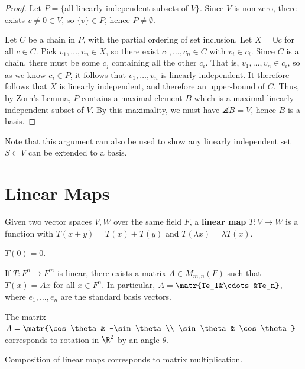 \begin{proof}
    Let $P = \{$all linearly independent subsets of $V\}$. Since $V$ is non-zero, there exists $v \neq 0 \in V$, so $\{v\} \in P$, hence $P \ne \emptyset$.

    Let $C$ be a chain in $P$, with the partial ordering of set inclusion. Let $X = \cup c$ for all $c \in C$. Pick $v_1,\dots,v_n \in X$, so there exist $c_1,\dots,c_n \in C$ with $v_i \in c_i$. Since $C$ is a chain, there must be some $c_j$ containing all the other $c_i$. That is, $v_1,\dots,v_n \in c_i$, so as we know $c_i \in P$, it follows that $v_1,\dots,v_n$ is linearly independent. It therefore follows that $X$ is linearly independent, and therefore an upper-bound of $C$. Thus, by Zorn's Lemma, $P$ contains a maximal element $B$ which is a maximal linearly independent subset of $V$. By this maximality, we must have $\angles B =V$, hence $B$ is a basis.
\end{proof}
Note that this argument can also be used to show any linearly independent set $S \subset V$ can be extended to a basis.

\section{Linear Maps}

\begin{defn}
    Given two vector spaces $V,W$ over the same field $F$, a \textbf{linear map} $T:V \to W$ is a function with $T(x+y) = T(x) + T(y)$ and $T(\lambda x)=\lambda T(x)$.
\end{defn}

\begin{prop}
    $T(0)=0$.
\end{prop}

\begin{thm}
    If $T:F^n \to F^m$ is linear, there exists a matrix $A \in M_{m,n}(F)$ such that $T(x)=Ax$ for all $x \in F^n$. In particular, $A=\matr{Te_1&\cdots &Te_n}$, where $e_1,\dots,e_n$ are the standard basis vectors.
\end{thm}

\begin{ex}
    The matrix $A = \matr{\cos \theta & -\sin \theta \\ \sin \theta & \cos \theta}$ corresponds to rotation in $\R^2$ by an angle $\theta$.
\end{ex}

\begin{rmk}
    Composition of linear maps corresponds to matrix multiplication.
\end{rmk}

